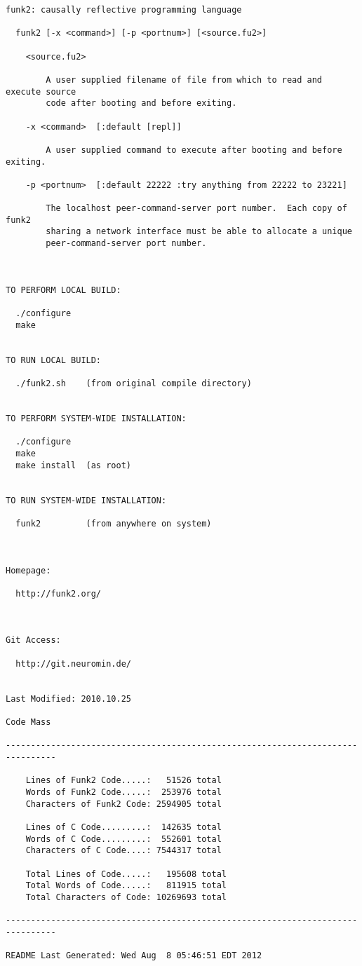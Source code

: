 \lstset{basicstyle=\scriptsize}
\begin{lstlisting}
funk2: causally reflective programming language

  funk2 [-x <command>] [-p <portnum>] [<source.fu2>]

    <source.fu2>

        A user supplied filename of file from which to read and execute source
        code after booting and before exiting.

    -x <command>  [:default [repl]]

        A user supplied command to execute after booting and before exiting.

    -p <portnum>  [:default 22222 :try anything from 22222 to 23221]

        The localhost peer-command-server port number.  Each copy of funk2
        sharing a network interface must be able to allocate a unique
        peer-command-server port number.



TO PERFORM LOCAL BUILD:

  ./configure
  make


TO RUN LOCAL BUILD:

  ./funk2.sh    (from original compile directory)


TO PERFORM SYSTEM-WIDE INSTALLATION:

  ./configure
  make
  make install  (as root)


TO RUN SYSTEM-WIDE INSTALLATION:

  funk2         (from anywhere on system)



Homepage:

  http://funk2.org/



Git Access:

  http://git.neuromin.de/


Last Modified: 2010.10.25

Code Mass

--------------------------------------------------------------------------------

    Lines of Funk2 Code.....:   51526 total
    Words of Funk2 Code.....:  253976 total
    Characters of Funk2 Code: 2594905 total

    Lines of C Code.........:  142635 total
    Words of C Code.........:  552601 total
    Characters of C Code....: 7544317 total

    Total Lines of Code.....:   195608 total
    Total Words of Code.....:   811915 total
    Total Characters of Code: 10269693 total

--------------------------------------------------------------------------------

README Last Generated: Wed Aug  8 05:46:51 EDT 2012
\end{lstlisting}

